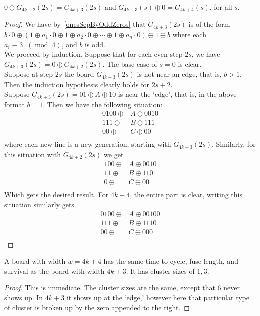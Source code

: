 \documentclass[12pt,letterpaper]{article}
\newcommand{\Mod}[1]{\ensuremath{\;\;(\operatorname{mod}\;#1)}}
\begin{document}
\begin{prop}
  $0\oplus G_{4k+2}(2s)=G_{4k+3}(2s)$ and $G_{4k+3}(s)\oplus 0=G_{4k+4}(s)$, for all $s$.
\end{prop}
\begin{proof}
  We have by~\cref{onesSepByOddZeros} that $G_{4k+3}(2s)$ is of the form $b\cdot 0 \oplus (1 \oplus a_1\cdot 0 \oplus 1\oplus a_2\cdot 0\oplus\cdots \oplus 1\oplus a_n\cdot 0) \oplus 1 \oplus b$
  where each $a_i\equiv 3 \Mod{4}$, and $b$ is odd. \\
  We proceed by induction. Suppose that for each even step $2s$, we have $G_{4k+3}(2s)=0\oplus G_{4k+2}(2s)$. The base case of $s=0$ is clear. \\
  Suppose at step $2s$ the board $G_{4k+3}(2s)$ is not near an edge, that is, $b>1$. Then the induction hypothesis clearly holds for $2s+2$. \\
  Suppose $G_{4k+3}(2s)=01\oplus A\oplus 10$ is near the `edge', that is, in the above format $b=1$. Then we have the following situation:
  \begin{align*}
    0100\oplus &A \oplus 0010 \\
    111\oplus &B \oplus 111 \\
    00\oplus &C \oplus 00 \\
  \end{align*}
  where each new line is a new generation, starting with $G_{4k+3}(2s)$. Similarly, for this situation with $G_{4k+2}(2s)$ we get
  \begin{align*}
    100\oplus &A\oplus 0010 \\
    11\oplus &B\oplus 110 \\
    0\oplus &C\oplus 00 \\
  \end{align*}
  Which gets the desired result. For $4k+4$, the entire part is clear, writing this situation similarly gets
  \begin{align*}
    0100\oplus &A \oplus 00100 \\
    111\oplus &B \oplus 1110 \\
    00\oplus &C \oplus 000 \\
  \end{align*}
\end{proof}

\begin{cor} \label{4mod4like3mod4}
  A board with width $w=4k+4$ has the same time to cycle, fuse length, and survival as the board with width $4k+3$. It has cluster sizes of $1,3$. 
\end{cor}
\begin{proof}
  This is immediate. The cluster sizes are the same, except that 6 never shows up. In $4k+3$ it shows up at the `edge,' however here that particular type of cluster is broken up by the zero appended to the right.
\end{proof}
\end{document}
